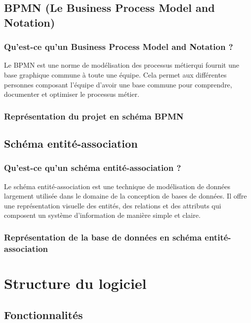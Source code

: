 \documentclass{rapport}
\begin{document}
\subsection{BPMN (Le Business Process Model and Notation)}
\subsubsection{Qu'est-ce qu'un Business Process Model and Notation ?}
Le BPMN est une norme de modélisation des processus métier\footnotemark[1] qui fournit une base graphique commune à toute une équipe. Cela permet aux différentes personnes composant l'équipe d'avoir une base commune pour comprendre, documenter et optimiser le processus métier. 
\subsubsection{Représentation du projet en schéma BPMN}

\newpage
\subsection{Schéma entité-association}
\subsubsection{Qu'est-ce qu'un schéma entité-association ?}
Le schéma entité-association est une technique de modélisation de données largement utilisée dans le domaine de la conception de bases de données. Il offre une représentation visuelle des entités, des relations et des attributs qui composent un système d'information de manière simple et claire.

\subsubsection{Représentation de la base de données en schéma entité-association}

\newpage
\section{Structure du logiciel}
\subsection{Fonctionnalités}
\end{document}
